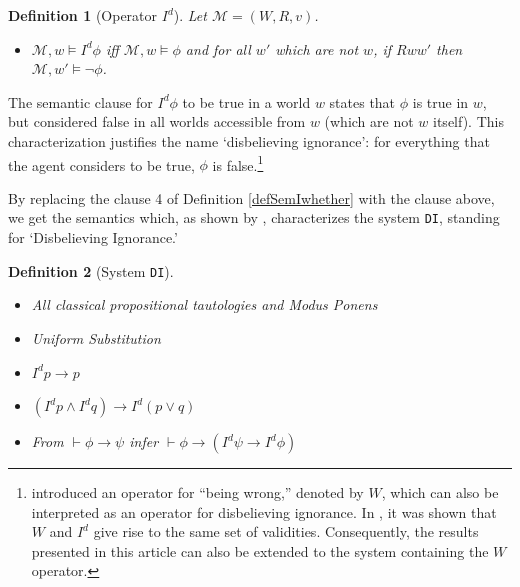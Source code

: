 \documentclass{article}
\newtheorem{defi}{Definition}
\begin{document}
\begin{defi}[Operator $I^{d}$]

Let $\mathcal{M} = (W, R, v)$.

\begin{itemize}


\item  $\mathcal{M}, w \models I^{d} \phi$ iff $\mathcal{M}, w \models \phi$ and for all $w'$ which are not $w$, if $Rww'$ then $\mathcal{M}, w'  \models \neg \phi$.

\end{itemize}

\end{defi}

The semantic clause for $I^{d} \phi$ to be true in a world $w$ states that $\phi$ is true in $w$, but considered false in all worlds accessible from $w$ (which are not $w$ itself). This characterization justifies the name `disbelieving ignorance': for everything that the agent considers to be true, $\phi$ is false.\footnote{\citet{Steinsvold2011} introduced an operator for ``being wrong,'' denoted by $W$, which can also be interpreted as an operator for disbelieving ignorance. In \citet{Gilbert2021}, it was shown that $W$ and $I^{d}$ give rise to the same set of validities. Consequently, the results presented in this article can also be extended to the system containing the $W$ operator.}

By replacing the clause 4 of Definition \ref{defSemIwhether} with the clause above, we get the semantics which, as shown by \citet{Gilbert2021}, characterizes the system \texttt{DI}, standing for `Disbelieving Ignorance.'

\begin{defi}[System \texttt{DI}]

\

\begin{itemize}

\item[(CPL)] All classical propositional tautologies and Modus Ponens

\item[(US)] Uniform Substitution

\item[(A1$_{DI}$)] $I^{d} p \rightarrow p$

\item[(A2$_{DI}$)] $(I^{d} p \wedge I^{d} q) \rightarrow I^{d}(p \vee q)$

\item[(IR$_{DI}$)] From $\vdash \phi \rightarrow \psi$ infer $\vdash \phi \rightarrow (I^{d} \psi \rightarrow I^{d} \phi)$ 

\end{itemize}


\end{defi}
\end{document}
